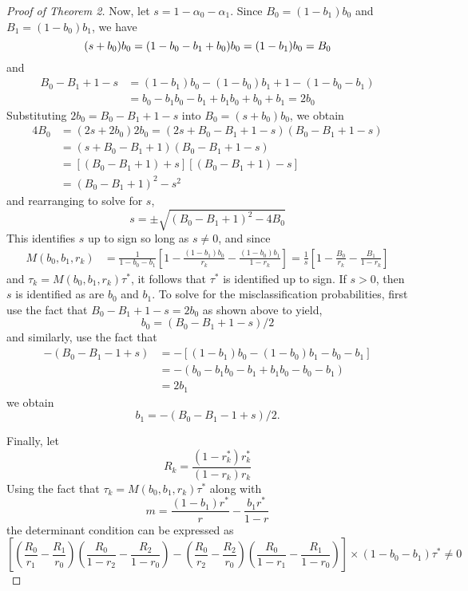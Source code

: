 \documentclass[12pt]{article}
\begin{document}
\begin{proof}[Proof of Theorem 2]
Now, let $s = 1 - \alpha_0 - \alpha_1$.
Since $B_{0}=(1-b_{1})b_{0}$ and $B_{1}=(1-b_{0})b_{1}$, we have
\[
  (s + b_0)b_0 = (1 - b_0 - b_1 + b_0) b_0 =  (1 - b_1) b_0 = B_0\\
\]
and 
\begin{align*}
  B_0 - B_1 + 1 - s &= (1 - b_1)b_0 - (1 - b_0)b_1 + 1 - (1 - b_0 - b_1)\\
  &= b_0 - b_1 b_0 - b_1 + b_1 b_0 + b_0 + b_1 = 2 b_0
\end{align*}
Substituting $2b_0 = B_0 - B_1 + 1 - s$ into $B_0 = (s + b_0)b_0$, we obtain 
\begin{align*}
  4 B_0 &= (2s + 2 b_0) 2 b_0 = (2s + B_0 - B_1 + 1 - s)(B_0 - B_1 + 1 - s)\\
  &= (s + B_0 - B_1 + 1)(B_0 - B_1 + 1 - s)\\
  &= [(B_0 - B_1 + 1) + s][(B_0 - B_1 + 1) - s]\\
  &= (B_0 - B_1 + 1)^2 - s^2
\end{align*}
and rearranging to solve for $s$,
\[
  s = \pm \sqrt{(B_0 - B_1 + 1)^2 - 4 B_0}
\]
This identifies $s$ up to sign so long as $s\neq0$, and since
\begin{align*}
  M(b_0, b_1, r_k) &= \frac{1}{1 - b_0 - b_1}\left[ 1 - \frac{(1 - b_1)b_0}{r_k} - \frac{(1-b_0)b_1}{1-r_k} \right]  
= \frac{1}{s}\left[ 1 - \frac{B_0}{r_k} - \frac{B_1}{1 - r_k} \right]
\end{align*}
and $\tau_k = M(b_0,b_1,r_k)\tau^*$, it follows that $\tau^*$ is identified up to sign.
If $s > 0$, then $s$ is identified as are $b_0$ and $b_1$.
To solve for the misclassification probabilities, first use the fact that $B_0 - B_1 + 1 - s = 2 b_0$ as shown above to yield,
\[
  b_0 = (B_0 - B_1 + 1 - s) / 2
\]
and similarly, use the fact that
\begin{align*}
  -(B_0 - B_1 - 1 + s) &= -\left[ (1 - b_1)b_0 - (1 - b_0)b_1  - b_0 - b_1 \right] \\
  &= -(b_0 - b_1 b_0 - b_1 + b_1 b_0 - b_0 - b_1)\\ 
  &= 2 b_1
\end{align*}
we obtain
\[
  b_1 = -(B_0 - B_1 - 1 + s) / 2.
\]

Finally, let 
\[
R_k = \displaystyle \frac{(1 - r_k^*)r_k^*}{(1 - r_k)r_k}
\]
Using the fact that $\tau_k = M(b_0, b_1, r_k) \tau^*$ along with 
\[
  m = \frac{(1 - b_1)r^*}{r} - \frac{b_1 r^*}{1-r}
\] 
the determinant condition can be expressed as  
\[
  \left[ \left( \frac{R_0}{r_1} - \frac{R_1}{r_0} \right)\left( \frac{R_0}{1 - r_2} - \frac{R_2}{1 - r_0} \right) - \left( \frac{R_0}{r_2} - \frac{R_2}{r_0} \right)\left( \frac{R_0}{1 - r_1} - \frac{R_1}{1 - r_0} \right) \right] \times (1 - b_0 - b_1) \tau^* \neq 0
\]

\end{proof}
\end{document}
